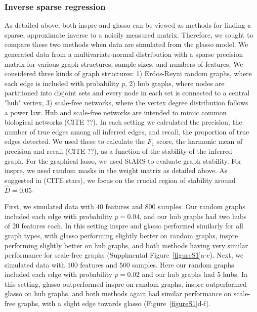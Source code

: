 \documentclass{article}
\begin{document}
\subsubsection*{Inverse sparse regression}
As detailed above, both inspre and glasso can be viewed as methods
for finding a sparse, approximate inverse to a noisily measured matrix.
Therefore, we sought to compare these two methods when data are simulated
from the glasso model. We generated data
from a multivariate-normal distribution with a sparse precision matrix
for various graph structures, sample sizes, and numbers of features.
We considered three kinds of graph structures: 1) Erdos-Reyni random graphs,
where each edge is included with probability $p$, 2) hub graphs, where nodes
are partitioned into
disjoint sets and every node in each set is connected to a central "hub" vertex,
3) scale-free networks, where the vertex degree distribution
follows a power law. Hub and scale-free networks are intended to mimic common
biological networks (CITE ??). In each setting we calculated the precision,
the number of true edges among all inferred edges, and recall, the proportion
of true edges detected. We used these to calculate the $F_1$ score, the
harmonic mean of precision and recall (CITE ??), as a function of the
stability of the inferred graph. For the graphical lasso, we used StARS to
evaluate graph stability. For inspre, we used random masks in the weight matrix
as detailed above. As suggested in (CITE stars), we focus on the crucial
region of stability around $\hat{D} = 0.05$.

First, we simulated data with $40$ features and $800$ samples. Our random
graphs included each edge with probability $p=0.04$, and our hub graphs had
two hubs of $20$ features each. In this setting inspre and glasso performed
similarly for all graph types, with glasso performing slightly better on
random graphs, inspre performing slightly better on hub graphs, and 
both methods having very similar performance for scale-free graphs
(Supplmental Figure~\ref{figureS1}a-c). Next, we simulated  data with $100$
features and $500$ samples. Here our random graphs included each edge with probability $p=0.02$ and our hub graphs had $5$ hubs. In this setting, glasso outperformed inspre on
random graphs, inspre outperformed glasso on hub graphs, and both methods again
had similar performance on scale-free graphs, with a slight edge towards
glasso (Figure~\ref{figureS1}d-f).
\end{document}
